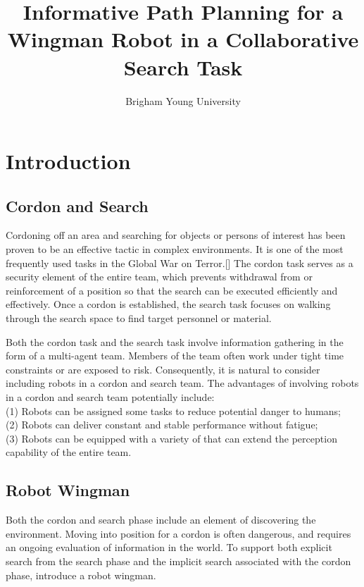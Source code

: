 \documentclass[12pt]{article}
\begin{document}
\title{\textsf{Informative Path Planning for a Wingman Robot in a Collaborative Search Task}}
\date{\textsf{Brigham Young University}}

\maketitle

\section{Introduction}

\subsection{Cordon and Search}

Cordoning off an area and searching for objects or persons of interest has been proven to be an effective tactic in complex environments. It is one of the most frequently used tasks in the Global War on Terror.[\cite{waggener2010air}] The cordon task serves as a security element of the entire team, which prevents withdrawal from or reinforcement of a position so that the search can be executed efficiently and effectively. Once a cordon is established, the search task focuses
on walking through the search space to find target personnel or material.

Both the cordon task and the search task involve information gathering in the form of a multi-agent team. Members of the team often work under tight time constraints or are exposed to risk. Consequently, it is natural to consider including robots in a cordon and search team. The advantages of involving robots in a cordon and search team potentially include: \\
(1) Robots can be assigned some tasks to reduce potential danger to humans; \\
(2) Robots can deliver constant and stable performance without fatigue; \\
(3) Robots can be equipped with a variety of that can extend the perception capability of the entire team.

\subsection{Robot Wingman}

Both the cordon and search phase include an element of discovering the environment. Moving into position for a cordon is often dangerous, and requires an ongoing evaluation of information in the world. To support both explicit search from the search phase and the implicit search associated with the cordon phase, \cite{goodrich2013toward} introduce a robot wingman. 
\end{document}

